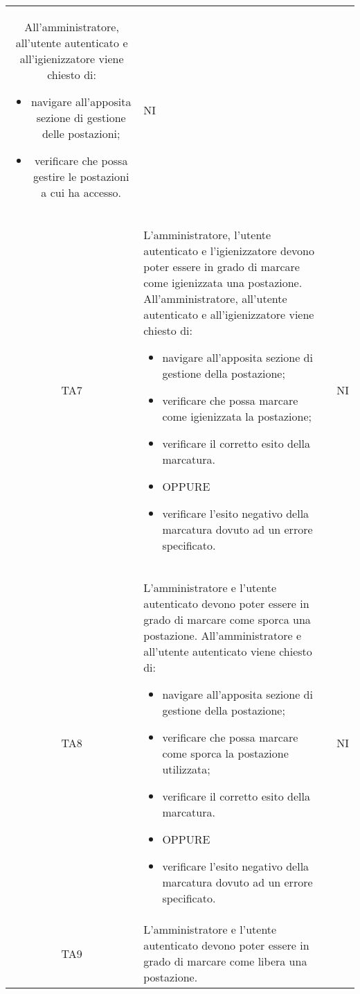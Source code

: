 {\begin{longtable}{ c C{11cm} c }
        All'amministratore, all'utente autenticato e all'igienizzatore viene chiesto di:
        \begin{itemize}
            \item navigare all'apposita sezione di gestione delle postazioni;
            \item verificare che possa gestire le postazioni a cui ha accesso.
        \end{itemize}&
        NI\\
        TA7&
        L'amministratore, l'utente autenticato e l'igienizzatore devono poter essere in grado di marcare come igienizzata una postazione.\newline
        All'amministratore, all'utente autenticato e all'igienizzatore viene chiesto di:
        \begin{itemize}
            \item navigare all'apposita sezione di gestione della postazione;
            \item verificare che possa marcare come igienizzata la postazione;
            \item verificare il corretto esito della marcatura.
            \item [] OPPURE
            \item verificare l'esito negativo della marcatura dovuto ad un errore specificato.
        \end{itemize}&
        NI\\
        TA8&
        L'amministratore e l'utente autenticato devono poter essere in grado di marcare come sporca una postazione.\newline
        All'amministratore e all'utente autenticato viene chiesto di:
        \begin{itemize}
            \item navigare all'apposita sezione di gestione della postazione;
            \item verificare che possa marcare come sporca la postazione utilizzata;
            \item verificare il corretto esito della marcatura.
            \item [] OPPURE
            \item verificare l'esito negativo della marcatura dovuto ad un errore specificato.
        \end{itemize}&
        NI\\
        TA9&
        L'amministratore e l'utente autenticato devono poter essere in grado di marcare come libera una postazione.\newline

\end{longtable}}
